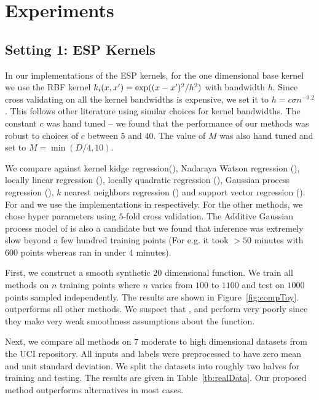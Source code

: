 \section{Experiments}
\label{sec:experiments}

\insertTableRealData

\subsection{Setting 1: ESP Kernels}

In our implementations of the ESP kernels, for the one dimensional base kernel we use
the RBF kernel $k_i(x,x') = \exp((x-x')^2/h^2)$ with bandwidth $h$.
Since cross validating on all the kernel bandwidths is expensive, we set
it to $h = c\sigma n^{-0.2}$. This follows other literature 
\cite{gyorfi02distributionfree,ravikumar09spam} using similar choices for kernel
bandwidths. The constant $c$ was hand tuned -- we found that the performance of
our methods was robust to choices of $c$ between $5$ and $40$.
The value of $M$ was also hand tuned and set to $M = \min(D/4, 10)$.

We compare \addkrrs against kernel kidge regression(\krr),
Nadaraya Watson regression (\nw), locally linear regression (\locallin), locally
quadratic regression (\localquad), Gaussian process regression (\gp), $k$
nearest neighbors regression (\knn) and support vector regression (\svr).
For \gps and \svrs we use the implementations in
\citet{rasmussen10gpml,chang11libsvm} respectively.
For the other methods, we chose hyper parameters using $5$-fold cross
validation.
The Additive Gaussian process model of \citet{duvenaud11additivegps} is also a
candidate but we found that inference was extremely slow beyond a few hundred
training points (For e.g. it took $> 50$ minutes with $600$ points whereas
\addkrrs ran in under $4$ minutes).

First, we construct a smooth synthetic 20 dimensional function. We train all methods on
$n$ training points where $n$ varies from $100$ to $1100$ and test on $1000$
points sampled independently. The results are shown in Figure~\ref{fig:compToy}.
\addkrrs outperforms all other methods. We suspect that \nw, \locallins and \knns perform
very poorly since they make very weak smoothness assumptions about the function.

Next, we compare all methods on $7$ moderate to high dimensional datasets from the UCI
repository. All inputs and labels were preprocessed to have zero mean and unit
standard deviation. We split the datasets into roughly two halves for training
and testing. The results are given in Table~\ref{tb:realData}. Our proposed
method outperforms alternatives in most cases.


